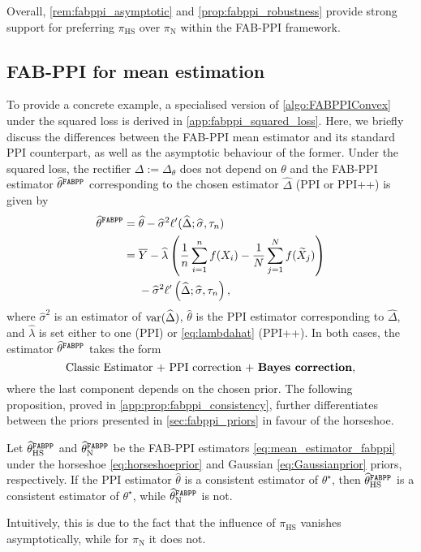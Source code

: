 Overall, \cref{rem:fabppi_asymptotic} and \cref{prop:fabppi_robustness} provide strong support for preferring $\pi_\text{HS}$ over $\pi_\text{N}$ within the FAB-PPI framework.

\subsection{FAB-PPI for mean estimation}\label{sec:fabppi_mean_estimation}
To provide a concrete example, a specialised version of \cref{algo:FABPPIConvex} under the squared loss is derived in \cref{app:fabppi_squared_loss}.
Here, we briefly discuss the differences between the FAB-PPI mean estimator and its standard PPI counterpart, as well as the asymptotic behaviour of the former.
Under the squared loss, the rectifier $\Delta := \Delta_\theta$ does not depend on $\theta$ and the FAB-PPI estimator $\widehat \theta^{\mathrm{\texttt{FABPP}}}$ corresponding to the chosen estimator $\widehat\Delta$ (PPI or PPI++) is given by 
\begin{align}
    \widehat \theta^{\mathrm{\texttt{FABPP}}} &=  \widehat \theta - \widehat\sigma^2 \ell'(\widehat\Delta; \widehat\sigma, \tau_n) \label{eq:mean_estimator_fabppi}\\
    &=\overline Y - \widehat\lambda\left( \frac{1}{n}\sum_{i=1}^n f(X_i) - \frac{1}{N}\sum_{j=1}^{N} f(\widetilde X_j) \right) \nonumber \\
    &~~~~- \widehat\sigma^2 \ell'\left(\widehat\Delta; \widehat\sigma, \tau_n\right),\nonumber
\end{align}
where $\widehat\sigma^2$ is an estimator of $\mathrm{var}(\widehat\Delta)$, $\widehat \theta$ is the PPI estimator corresponding to $\widehat\Delta$, and $\widehat\lambda$ is set either to one (PPI) or \eqref{eq:lambdahat} (PPI++).
In both cases, the estimator $\widehat \theta^{\mathrm{\texttt{FABPP}}}$ takes the form
$$
    \text{\normalsize Classic Estimator + PPI correction + \textbf{Bayes correction}},
$$
where the last component depends on the chosen prior. The following proposition, proved in \cref{app:prop:fabppi_consistency}, further differentiates between the priors presented in \cref{sec:fabppi_priors} in favour of the horseshoe.
\begin{proposition}
    \label{prop:fabppi_consistency}
    Let $\widehat \theta^{\mathrm{\texttt{FABPP}}}_\text{HS}$ and $\widehat \theta^{\mathrm{\texttt{FABPP}}}_\text{N}$ be the FAB-PPI estimators \eqref{eq:mean_estimator_fabppi} under the horseshoe \eqref{eq:horseshoeprior} and Gaussian \eqref{eq:Gaussianprior} priors, respectively. If the PPI estimator $\widehat \theta$ is a consistent estimator of $\theta^\star$, then $\widehat \theta^{\mathrm{\texttt{FABPP}}}_\text{HS}$ is a consistent estimator of $\theta^\star$, while $\widehat \theta^{\mathrm{\texttt{FABPP}}}_\text{N}$ is not.
\end{proposition}
Intuitively, this is due to the fact that the influence of $\pi_\text{HS}$ vanishes asymptotically, while for $\pi_\text{N}$ it does not.
